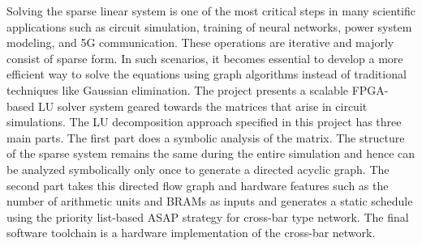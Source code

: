 \begin{Abstract}
\noindent
Solving the sparse linear system is one of the most critical steps in many scientific applications such as circuit simulation, training of neural networks, power system modeling, and 5G communication. These operations are iterative and majorly consist of sparse form. In such scenarios, it becomes essential to develop a more efficient way to solve the equations using graph algorithms instead of traditional techniques like Gaussian elimination. The project presents a scalable FPGA-based LU solver system geared towards the matrices that arise in circuit simulations. The LU decomposition approach specified in this project has three main parts. The first part does a symbolic analysis of the matrix. The structure of the sparse system remains the same during the entire simulation and hence can be analyzed symbolically only once to generate a directed acyclic graph. The second part takes this directed flow graph and hardware features such as the number of arithmetic units and BRAMs as inputs and generates a static schedule using the priority list-based ASAP strategy for cross-bar type network. The final software toolchain is a hardware implementation of the cross-bar network.

\end{Abstract}